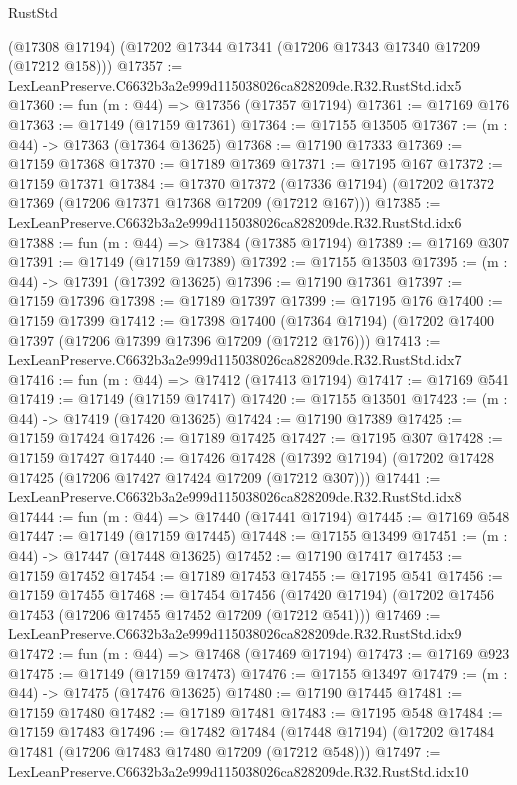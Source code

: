 \begin{lexlean}{RustStd}
\begin{coremodule}
    (@17308 @17194)
    (@17202 @17344 @17341 (@17206 @17343 @17340 @17209 (@17212 @158)))
@17357 := LexLeanPreserve.C6632b3a2e999d115038026ca828209de.R32.RustStd.idx5
@17360 := fun (m : @44) => @17356 (@17357 @17194)
@17361 := @17169 @176
@17363 := @17149 (@17159 @17361)
@17364 := @17155 @13505
@17367 := (m : @44) -> @17363 (@17364 @13625)
@17368 := @17190 @17333
@17369 := @17159 @17368
@17370 := @17189 @17369
@17371 := @17195 @167
@17372 := @17159 @17371
@17384 := @17370
    @17372
    (@17336 @17194)
    (@17202 @17372 @17369 (@17206 @17371 @17368 @17209 (@17212 @167)))
@17385 := LexLeanPreserve.C6632b3a2e999d115038026ca828209de.R32.RustStd.idx6
@17388 := fun (m : @44) => @17384 (@17385 @17194)
@17389 := @17169 @307
@17391 := @17149 (@17159 @17389)
@17392 := @17155 @13503
@17395 := (m : @44) -> @17391 (@17392 @13625)
@17396 := @17190 @17361
@17397 := @17159 @17396
@17398 := @17189 @17397
@17399 := @17195 @176
@17400 := @17159 @17399
@17412 := @17398
    @17400
    (@17364 @17194)
    (@17202 @17400 @17397 (@17206 @17399 @17396 @17209 (@17212 @176)))
@17413 := LexLeanPreserve.C6632b3a2e999d115038026ca828209de.R32.RustStd.idx7
@17416 := fun (m : @44) => @17412 (@17413 @17194)
@17417 := @17169 @541
@17419 := @17149 (@17159 @17417)
@17420 := @17155 @13501
@17423 := (m : @44) -> @17419 (@17420 @13625)
@17424 := @17190 @17389
@17425 := @17159 @17424
@17426 := @17189 @17425
@17427 := @17195 @307
@17428 := @17159 @17427
@17440 := @17426
    @17428
    (@17392 @17194)
    (@17202 @17428 @17425 (@17206 @17427 @17424 @17209 (@17212 @307)))
@17441 := LexLeanPreserve.C6632b3a2e999d115038026ca828209de.R32.RustStd.idx8
@17444 := fun (m : @44) => @17440 (@17441 @17194)
@17445 := @17169 @548
@17447 := @17149 (@17159 @17445)
@17448 := @17155 @13499
@17451 := (m : @44) -> @17447 (@17448 @13625)
@17452 := @17190 @17417
@17453 := @17159 @17452
@17454 := @17189 @17453
@17455 := @17195 @541
@17456 := @17159 @17455
@17468 := @17454
    @17456
    (@17420 @17194)
    (@17202 @17456 @17453 (@17206 @17455 @17452 @17209 (@17212 @541)))
@17469 := LexLeanPreserve.C6632b3a2e999d115038026ca828209de.R32.RustStd.idx9
@17472 := fun (m : @44) => @17468 (@17469 @17194)
@17473 := @17169 @923
@17475 := @17149 (@17159 @17473)
@17476 := @17155 @13497
@17479 := (m : @44) -> @17475 (@17476 @13625)
@17480 := @17190 @17445
@17481 := @17159 @17480
@17482 := @17189 @17481
@17483 := @17195 @548
@17484 := @17159 @17483
@17496 := @17482
    @17484
    (@17448 @17194)
    (@17202 @17484 @17481 (@17206 @17483 @17480 @17209 (@17212 @548)))
@17497 := LexLeanPreserve.C6632b3a2e999d115038026ca828209de.R32.RustStd.idx10

\end{coremodule}
\end{lexlean}
